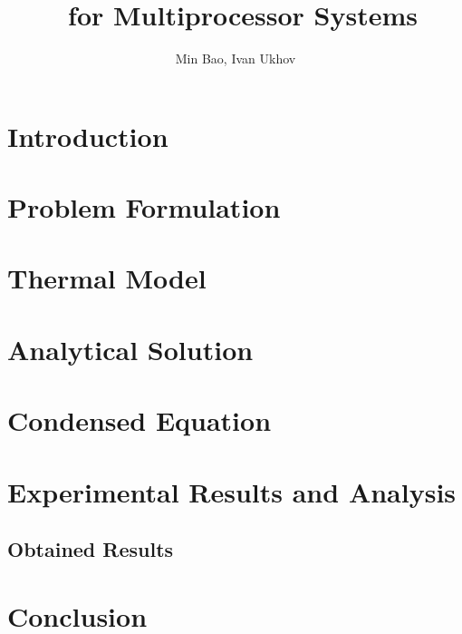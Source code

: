 \documentclass[11pt,a4paper]{article}
\author{Min Bao, Ivan Ukhov}
\title{\ssdtc\ for Multiprocessor Systems}
\begin{document}
  \maketitle

  \section{Introduction}
  

  \section{Problem Formulation}
  

  \section{Thermal Model}
  

  \section{Analytical Solution}
  

  \section{Condensed Equation}
  

  \section{Experimental Results and Analysis} \label{sec:experimental-results}
  

  \subsection{Obtained Results}

  \section{Conclusion}

  
\end{document}
